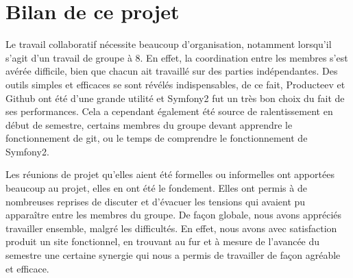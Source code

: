 \chapter{Bilan de ce projet}

Le travail collaboratif nécessite beaucoup d'organisation, notamment lorsqu'il s'agit d'un travail de groupe à 8. En effet, la coordination entre les membres s'est avérée difficile, bien que chacun ait travaillé sur des parties indépendantes.
Des outils simples et efficaces se sont révélés indispensables, de ce fait, Producteev et Github ont été d'une grande utilité et Symfony2 fut un très bon choix du fait de ses performances. Cela a cependant également été source de ralentissement en début de semestre, certains membres du groupe devant apprendre le fonctionnement de git, ou le temps de comprendre le fonctionnement de Symfony2.

Les réunions de projet qu'elles aient été formelles ou informelles ont apportées beaucoup au projet, elles en ont été le fondement. Elles ont permis à de nombreuses reprises de discuter et d'évacuer les tensions qui avaient pu apparaître entre les membres du groupe.
De façon globale, nous avons appréciés travailler ensemble, malgré les difficultés. En effet, nous avons avec satisfaction produit un site fonctionnel, en trouvant au fur et à mesure de l'avancée du semestre une certaine synergie qui nous a permis de travailler de façon agréable et efficace.

